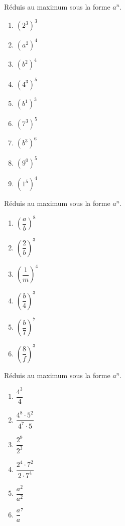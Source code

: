 \begin{exercise}
  Réduis au maximum sous la forme $a^n$.
  \begin{enumerate}[cols=6]
    \item \(\left( 2^{3} \right)^{3} \)
    \item \(\left( a^{2} \right)^{4} \)
    \item \(\left( b^{2} \right)^{4} \)
    \item \(\left( 4^{3} \right)^{5} \)
    \item \(\left( b^{1} \right)^{3} \)
    \item \(\left( 7^{3} \right)^{5} \)
    \item \(\left( b^{3} \right)^{6} \)
    \item \(\left( 9^{0} \right)^{5} \)
    \item \(\left( 1^{5} \right)^{4} \)
  \end{enumerate}
\end{exercise}

\begin{exercise}
  Réduis au maximum sous la forme $a^n$.
  \begin{enumerate}[cols=6]
    \item \(\left( \dfrac{a}{b} \right)^{8} \)
    \item \(\left( \dfrac{2}{b} \right)^{3} \)
    \item \(\left( \dfrac{1}{m} \right)^{4} \)
    \item \(\left( \dfrac{b}{4} \right)^{3} \)
    \item \(\left( \dfrac{b}{7} \right)^{7} \)
    \item \(\left( \dfrac{8}{f} \right)^{3} \)
  \end{enumerate}
\end{exercise}

\begin{exercise}
  Réduis au maximum sous la forme $a^n$.
  \begin{enumerate}[cols=3]
    \item \(\dfrac{4^{3}}{4} \)
    \item \(\dfrac{4^{8} \cdot 5^{2}}{4^{7} \cdot 5}\)
    \item \(\dfrac{2^{9}}{2^{3}}\)
    \item \(\dfrac{2^{4} \cdot 7^{2}}{2 \cdot 7^{4}}\)
    \item \(\dfrac{a^{2}}{a^{2}}\)
    \item \(\dfrac{a}{a}^{7}\)
  \end{enumerate}
\end{exercise}

